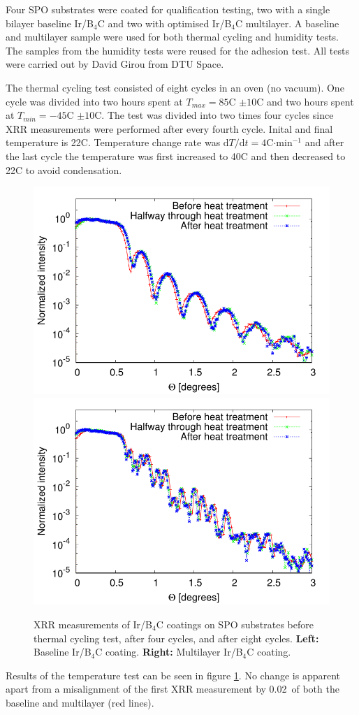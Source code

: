 Four SPO substrates were coated for qualification testing, two with a single bilayer baseline Ir/B$_4$C and two with optimised Ir/B$_4$C multilayer. A baseline and multilayer sample were used for both thermal cycling and humidity tests. The samples from the humidity tests were reused for the adhesion test. All tests were carried out by David Girou from DTU Space.

The thermal cycling test consisted of eight cycles in an oven (no vacuum). One cycle was divided into two hours spent at $T_{max}=85$\degr C $\pm 10$\degr C and two hours spent at $T_{min}=-45$\degr C $\pm 10$\degr C. The test was divided into two times four cycles since XRR measurements were performed after every fourth cycle. Inital and final temperature is 22\degr C. Temperature change rate was ${\text{d}T}/{\text{d}t}=4$\degr C$\cdot$min$^{-1}$ and after the last cycle the temperature was first increased to 40\degr C and then decreased to 22\degr C to avoid condensation.

\begin{figure}[!h]
  \center
  \includegraphics[width=0.47\linewidth]{figures/athena/coating_on_spo/123-10-12_cooked_2.pdf}
  \includegraphics[width=0.47\linewidth]{figures/athena/coating_on_spo/120-10-21_cooked_2.pdf}
\caption{\footnotesize XRR measurements of Ir/B$_4$C coatings on SPO substrates before thermal cycling test, after four cycles, and after eight cycles. \textbf{Left:} Baseline Ir/B$_4$C coating. \textbf{Right:} Multilayer Ir/B$_4$C coating.}\label{fig:qa_temp}
\end{figure}

Results of the temperature test can be seen in figure \ref{fig:qa_temp}. No change is apparent apart from a misalignment of the first XRR measurement by 0.02\degr\ of both the baseline and multilayer (red lines).

